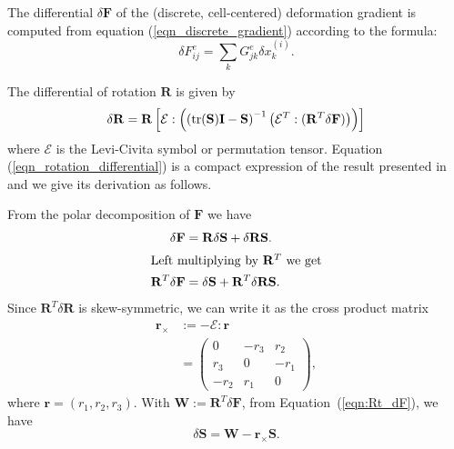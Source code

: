 The differential $\delta\mathbf{F}$ of the (discrete, cell-centered) deformation gradient is computed from equation (\ref{eqn_discrete_gradient}) according to the formula:
\begin{equation}
\delta F_{ij}^e=\sum_kG_{jk}^e\delta x_k^{(i)}.
\label{eqn_deformation_gradient_differential}
\end{equation}

The differential of rotation $\mathbf{R}$ is given by
\begin{equation}
\delta\mathbf{R}=\mathbf{R}\left[\mathcal{E}:\left(\left(\mbox{tr}(\mathbf{S})\mathbf{I}-\mathbf{S}\right)^{-1}\left(\mathcal{E}^T:(\mathbf{R}^T\delta\mathbf{F})\right)\right)\right]
\label{eqn_rotation_differential}
\end{equation}
where $\mathcal{E}$ is the Levi-Civita symbol or permutation tensor. Equation (\ref{eqn_rotation_differential})
is a compact expression of the result presented
in \cite{twigg2010point} and we give its derivation as follows.

From the polar decomposition of $\mathbf{F}$ we have
\begin{align}
\delta\mathbf{F} &= \mathbf{R}\delta\mathbf{S}
+ \delta \mathbf{R}\mathbf{S}.\nonumber\\
\intertext{Left multiplying by $\mathbf{R}^T$ we get}
\mathbf{R}^T\delta\mathbf{F} &= \delta\mathbf{S}
+ \mathbf{R}^T\delta \mathbf{R}\mathbf{S}.\label{eqn:Rt_dF}
\end{align}
Since $\mathbf{R}^T\delta\mathbf{R}$ is skew-symmetric, we can write
it as the cross product matrix 
\begin{align*}
\mathbf{r}_\times &:= -\mathcal{E}:\mathbf{r}\\
                  &=\left(\begin{array}{ccc}
                  0 & -r_3 & r_2\\
                  r_3& 0 & -r_1\\
                  -r_2 & r_1 & 0\end{array}\right),
\end{align*} 
where $\mathbf{r}= (r_1,r_2,r_3)$. With
$\mathbf{W}:=\mathbf{R}^T\delta\mathbf{F}$, from
Equation~(\ref{eqn:Rt_dF}), we have
\begin{equation*}
\delta\mathbf{S} = \mathbf{W}-\mathbf{r}_\times\mathbf{S}.
\end{equation*}

